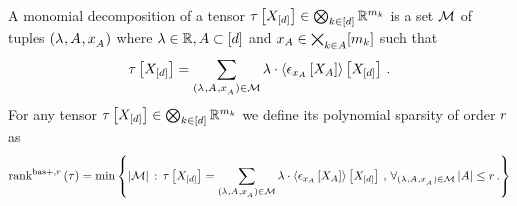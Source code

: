 \begin{definition}
    \label{def:polynomialSparsity}
    A monomial decomposition of a tensor $ \tau\left[X_{[d]}\right]\in\bigotimes_{k\in[d]} \mathbb{R}^{m_{k}}$ is a set $\mathcal{M}$ of tuples $(\lambda^{}, A^{}, x_{A^{}}^{})$ where $\lambda\in\mathbb{R}, A\subset[d]$ and $x_{A}\in\bigtimes_{k\in A} [m_{k}]$ such that
    \begin{align}
        \label{eq:decIntoMonomials}
        \tau\left[X_{[d]}\right]
        = \sum_{(\lambda^{}, A^{}, x_{A^{}}^{})\in\mathcal{M}} \lambda \cdot \left\langle \epsilon_{x_{A}}\left[X_{A}\right]\right\rangle \left[ X_{[d]} \right] \, .
    \end{align}
    For any tensor $ \tau\left[X_{[d]}\right]\in\bigotimes_{k\in[d]} \mathbb{R}^{m_{k}}$ we define its polynomial sparsity of order $r$ as
    \begin{align*}
        \mathrm{rank}^{\mathrm{bas+},r}\left(\tau\right) =
        \min \left\{ \left|\mathcal{M}\right| \,:\,
        \tau\left[X_{[d]}\right] = \sum_{(\lambda^{}, A^{}, x_{A^{}}^{})\in\mathcal{M}} \lambda \cdot \left\langle \epsilon_{x_{A}}\left[X_{A}\right]\right\rangle \left[ X_{[d]} \right] \, , \, \forall_{(\lambda^{}, A^{}, x_{A^{}}^{})\in\mathcal{M}} \left|A\right| \leq r \, .
        \right\}
    \end{align*}
\end{definition}


